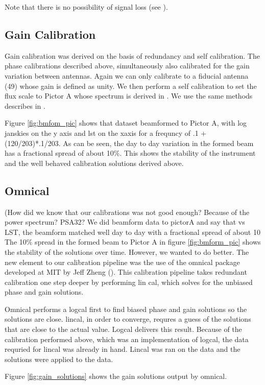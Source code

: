 \documentclass[twocolumn,numberedappendix]{emulateapj}
\begin{document}
Note that there is no possibility of signal loss (see \citep{parsons2014}).

\subsection{Gain Calibration}
Gain calibration was derived on the basis of redundancy and self calibration.
The phase calibrations described above, simultaneously also calibrated for the
gain variation between antennas. Again we can only calibrate to a fiducial
antenna (49) whose gain is defined as unity. We then perform a self calibration
to set the flux scale to Pictor A whose spectrum is derived in
\citep{jacops_2013}. We use the same methods describes in \citep{Parsons 2014}.

Figure \ref{fig:bmfom_pic} shows that dataset beamformed to Pictor A, with log
janskies on the y axis and lst on the xaxis for a frequncy of .1 + (120/203)*.1/203. 
As can be seen, the day to day variation in the formed beam has a fractional
spread of about 10$\%$.  This shows the stability of the instrument and the well
behaved calibration solutions derived above. 

\subsection{Omnical}
(How did we know that our calibrations was not good enough? Because of the power
spectrum? PSA32? We did beamform data to pictorA and say that vs LST, the
beamform matched well day to day with a fractional spread of about 10%
The 10$\%$ spread in the formed beam to Pictor A in figure \ref{fig:bmform_pic}
shows the stability of the solutions over time. However, we wanted to do better. 
The new element to our calibration pipeline was the use of the omnical package
developed at MIT by Jeff Zheng (\citep{zheng_et_al2014}). This calibration
pipeline takes redundant calibration one step deeper by performing lin cal,
which solves for the unbiased phase and gain solutions.  

Omnical performs a logcal first to find biased phase and gain solutions so the
solutions are close. lincal, in order to converge, requres a guess of the
solutions that are close to the actual value. Logcal delivers this result.
Because of the calibration performed above, which was an implementation of
logcal, the data requried for lincal was already in hand. Lincal was ran on the
data and the solutions were applied to the data.

Figure \ref{fig:gain_solutions} shows the gain solutions output by omnical. 
%
\end{document}
